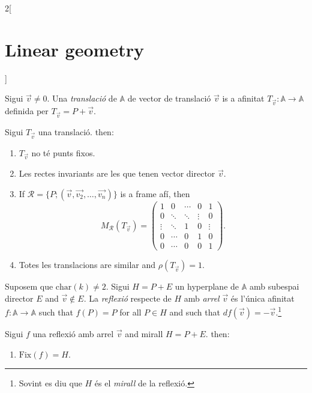 \documentclass[class=article,10pt,crop=false]{standalone}
\begin{document}
\begin{multicols}{2}[\section{Linear geometry}]
\begin{definition}
\end{definition}
\begin{definition}[Translació]
Sigui $\overrightarrow{v}\ne 0$. Una \textit{translació} de $\mathbb{A}$ de vector de translació $\overrightarrow{v}$ is a afinitat $T_{\overrightarrow{v}}:\mathbb{A}\rightarrow\mathbb{A}$ definida per $T_{\overrightarrow{v}}=P+\overrightarrow{v}$.
\end{definition}
\begin{prop}
Sigui $T_{\overrightarrow{v}}$ una translació. then:
\begin{enumerate}
    \item $T_{\overrightarrow{v}}$ no té punts fixos.
    \item Les rectes invariants are les que tenen vector director $\overrightarrow{v}$.
    \item If $\mathcal{R}=\{P;(\overrightarrow{v},\overrightarrow{v_2},\ldots,\overrightarrow{v_n})\}$ is a frame afí, then $$M_\mathcal{R}(T_{\overrightarrow{v}})=\left(\begin{array}{cccc|c}
        1 & 0 & \cdots & 0 & 1\\
        0 & \ddots & \ddots & \vdots  & 0\\
        \vdots & \ddots & 1 & 0 & \vdots\\
        0 & \cdots & 0 & 1 & 0\\
        \hline
        0 & \cdots & 0 & 0 &  1
    \end{array}\right).$$
    \item Totes les translacions are similar and $\rho(T_{\overrightarrow{v}})=1$.
\end{enumerate}
\end{prop}
\begin{definition}[Reflexions]
Suposem que $\text{char}(k)\ne 2$. Sigui $H=P+E$ un hyperplane de $\mathbb{A}$ amb subespai director $E$ and $\overrightarrow{v}\notin E$. La \textit{reflexió} respecte de $H$ amb \textit{arrel} $\overrightarrow{v}$ és l'única afinitat $f:\mathbb{A}\rightarrow\mathbb{A}$ such that $f(P)=P$ for all $P\in H$ and such that $df(\overrightarrow{v})=-\overrightarrow{v}$.\footnote{Sovint es diu que $H$ és el \textit{mirall} de la reflexió.}
\end{definition}
\begin{prop}
Sigui $f$ una reflexió amb arrel $\overrightarrow{v}$ and mirall $H=P+E$. then:
\begin{enumerate}
    \item $\text{Fix}(f)=H$.

\end{enumerate}
\end{prop}
\end{multicols}
\end{document}

